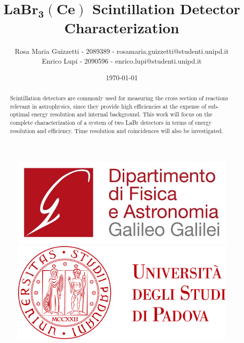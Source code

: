 \documentclass[rmp,10pt,onecolumn,fleqn,notitlepage]{revtex4-1}
\begin{document}



\begin{figure}[H]
\begin{minipage}{0.25\linewidth}
\includegraphics[width=\linewidth]{Images/logo/logo_DFA.jpg}
\end{minipage}
\hfill
\begin{minipage}{0.35\linewidth}
\includegraphics[width=\textwidth]{Images/logo/unipdwhite.png}
\end{minipage}
\end{figure}

\noindent\makebox[\linewidth]{\color{linescolor} \rule{0.85\paperwidth}{1.2 pt}}
\noindent\makebox[\linewidth]{\color{linescolor} \rule[0.3cm]{0.85\paperwidth}{1pt}}

\title{$\boldsymbol{LaBr_3(Ce)}$ Scintillation Detector Characterization}
\author{Rosa Maria Guizzetti - 2089389 - rosamaria.guizzetti@studenti.unipd.it \\ Enrico Lupi - 2090596 - enrico.lupi@studenti.unipd.it}
\date{\today}

\begin{abstract}

Scintillation detectors are commonly used for measuring the cross section of reactions relevant in astrophysics, since they provide high efficiencies at the expense of sub-optimal energy resolution and internal background. This work will focus on the complete characterization of a system of two LaBr detectors in terms of energy resolution and efficiency. Time resolution and coincidences will also be investigated.


\end{abstract}
\end{document}
